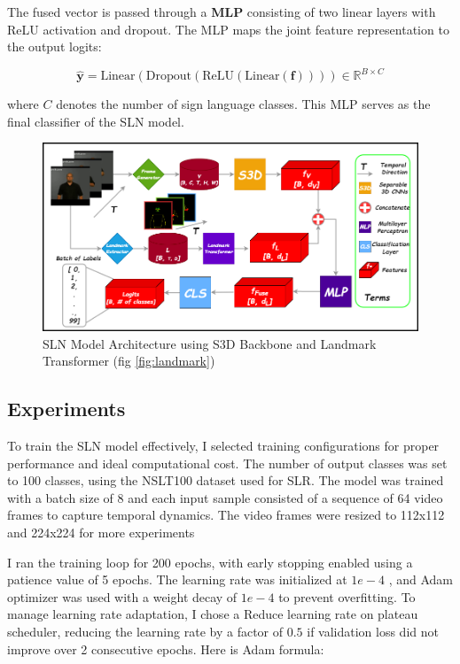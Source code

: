 \documentclass{article}
\begin{document}
The fused vector is passed through a \textbf{MLP} consisting of two linear layers with ReLU activation and dropout. The MLP maps the joint feature representation to the output logits:

\[
\hat{\mathbf{y}} = \text{Linear}(\text{Dropout}(\text{ReLU}(\text{Linear}(\mathbf{f})))) \in \mathbb{R}^{B \times C}
\]

where \( C \) denotes the number of sign language classes. This MLP serves as the final classifier of the SLN model.

\begin{figure}[H]
    \centering
    \includegraphics[width=1\linewidth]{Fig/SLNFull.drawio.png}
    \caption{SLN Model Architecture using S3D Backbone and Landmark Transformer (fig \ref{fig:landmark})}
    \label{fig:slnmodel}
\end{figure}

\subsection{Experiments}
To train the SLN model effectively, I selected training configurations for proper performance and ideal computational cost. The number of output classes was set to 100 classes, using the NSLT100 dataset used for SLR. The model was trained with a batch size of 8 and each input sample consisted of a sequence of 64 video frames to capture temporal dynamics. The video frames were resized to 112x112 and 224x224 for more experiments

\vspace{0.5cm}

I ran the training loop for 200 epochs, with early stopping enabled using a patience value of 5 epochs. The learning rate was initialized at $1e-4$ , and Adam optimizer was used with a weight decay of $1e-4$ to prevent overfitting. To manage learning rate adaptation, I chose a Reduce learning rate on plateau scheduler, reducing the learning rate by a factor of $0.5$ if validation loss did not improve over 2 consecutive epochs. Here is Adam formula:
\end{document}
